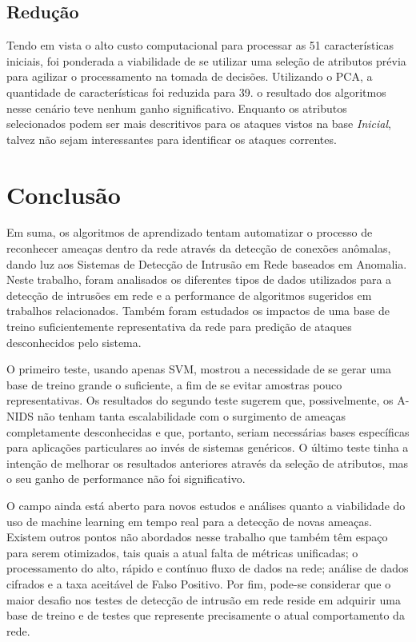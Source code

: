 \documentclass[12pt,a4paper]{article}
\begin{document}
    \subsection{Redução}
    Tendo em vista o alto custo computacional para processar as 51 características iniciais, foi ponderada a viabilidade
    de se utilizar uma seleção de atributos prévia para agilizar o processamento na tomada de decisões. Utilizando o
    PCA, a quantidade de características foi reduzida para 39.
    o resultado dos algoritmos nesse cenário teve nenhum ganho significativo. Enquanto os atributos selecionados podem
    ser mais descritivos para os ataques vistos na base \textit{Inicial}, talvez não sejam interessantes para
    identificar os ataques correntes.


\section{Conclusão}
    Em suma, os algoritmos de aprendizado tentam automatizar o processo de reconhecer ameaças dentro da rede
    através da detecção de conexões anômalas, dando luz aos Sistemas de Detecção de Intrusão em Rede baseados em Anomalia.
    Neste trabalho, foram analisados os diferentes tipos de dados utilizados para a detecção de intrusões em rede e a
    performance de algoritmos sugeridos em trabalhos relacionados. Também foram estudados os impactos de uma base de
    treino suficientemente representativa da rede para predição de ataques desconhecidos pelo sistema.
    \par O primeiro teste, usando apenas SVM, mostrou a necessidade de se gerar uma base de treino grande o suficiente, a
    fim de se evitar amostras pouco representativas. Os resultados do segundo teste sugerem que, possivelmente, os A-NIDS
    não tenham tanta escalabilidade com o surgimento de ameaças completamente desconhecidas e que, portanto, seriam
    necessárias bases específicas para aplicações particulares ao invés de sistemas genéricos. O último teste tinha a
    intenção de melhorar os resultados anteriores através da seleção de atributos, mas o seu ganho de performance não foi
    significativo.
    \par O campo ainda está aberto para novos estudos e análises quanto a viabilidade do uso de machine learning em tempo
    real para a detecção de novas ameaças. Existem outros pontos não abordados nesse trabalho que também têm espaço para
    serem otimizados, tais quais a atual falta de métricas unificadas; o processamento do alto, rápido e contínuo fluxo de
    dados na rede; análise de dados cifrados e a taxa aceitável de Falso Positivo. Por fim, pode-se considerar que
     o maior desafio nos testes de detecção de intrusão em rede reside em adquirir uma base de treino e de testes que
 represente precisamente o atual comportamento da rede.
\end{document}
